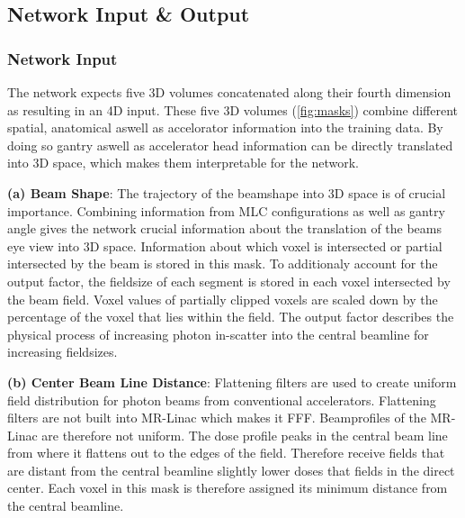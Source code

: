 \subsection{Network Input \& Output}

\subsubsection{Network Input}

The network expects five 3D volumes concatenated along their fourth dimension as resulting in an 4D input. 
These five 3D volumes (\autoref{fig:masks}) combine different spatial, anatomical aswell as accelorator information into the training data. 
By doing so gantry aswell as accelerator head information can be directly translated into 3D space, which makes them interpretable for the network. 

\setlength{\hangingindent}{1em}

\begin{hangingpar}
    \item \textbf{(a) Beam Shape}: The trajectory of the beamshape into 3D space is of crucial importance. 
    Combining information from \acs{MLC} configurations as well as gantry angle gives the network crucial information about the translation of the beams eye view into 3D space. 
    Information about which voxel is intersected or partial intersected by the beam is stored in this mask. 
    To additionaly account for the output factor, the fieldsize of each segment is stored in each voxel intersected by the beam field. 
    Voxel values of partially clipped voxels are scaled down by the percentage of the voxel that lies within the field. 
    The output factor describes the physical process of increasing photon in-scatter into the central beamline for increasing fieldsizes. 
    
\end{hangingpar}

\begin{hangingpar}
    \item \textbf{(b) Center Beam Line Distance}: 
    Flattening filters are used to create uniform field distribution for photon beams from conventional accelerators.
    Flattening filters are not built into MR-Linac which makes it \ac{FFF}. 
    Beamprofiles of the MR-Linac are therefore not uniform.
    The dose profile peaks in the central beam line from where it flattens out to the edges of the field.
    Therefore receive fields that are distant from the central beamline slightly lower doses that fields in the direct center.
    Each voxel in this mask is therefore assigned its minimum distance from the central beamline. 
\end{hangingpar}

